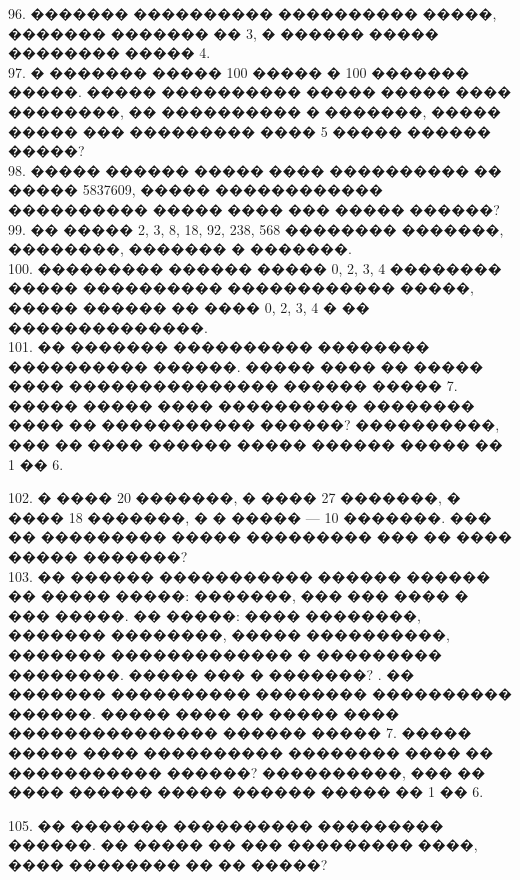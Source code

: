\documentclass[12pt]{article}
\begin{document}
96. ������� ���������� ���������� �����, ������� ������� �� 3, � ������ ����� �������� ����� 4.\\
97. � ������� ����� 100 ����� � 100 ������� �����. ����� ���������� ����� ����� ���� ��������, �� ���������� � �������, ����� ����� ��� ��������� ���� 5 ����� ������ �����?\\
98. ����� ������ ����� ���� ���������� �� ����� 5837609, ����� ������������ ���������� ����� ���� ��� ����� ������?\\
99. �� ����� 2, 3, 8, 18, 92, 238, 568 �������� �������, ��������, ������� � �������.\\
100. ��������� ������ ����� 0, 2, 3, 4 �������� ����� ���������� ������������ �����, ����� ������ �� ���� 0, 2, 3, 4 � �� ��������������.\\
101. �� ������� ���������� �������� ���������� ������. ����� ���� �� ����� ���� ��������������� ������ ����� 7. ����� ����� ���� ���������� �������� ���� �� ����������� ������? ����������, ��� �� ���� ������ ����� ������ ����� �� 1 �� 6.
\begin{center}
\begin{figure}[ht!]
\end{figure}
\end{center}
102. � ���� 20 �������, � ���� 27 �������, � ���� 18 �������, � � ����� --- 10 �������. ��� �� ��������� ����� ��������� ��� �� ���� ����� �������?\\
103. �� ������ ����������� ������ ������ �� ����� �����: �������, ��� ��� ���� � ��� �����. �� �����: ���� ��������, ������� ��������, ����� ����������, ������� ������������� � ��������� ��������. ����� ��� � �������?\newpage
{}. �� ������� ���������� �������� ���������� ������. ����� ���� �� ����� ���� ��������������� ������ ����� 7. ����� ����� ���� ���������� �������� ���� �� ����������� ������? ����������, ��� �� ���� ������ ����� ������ ����� �� 1 �� 6.
\begin{center}
\begin{figure}[ht!]
\end{figure}
\end{center}
105. �� ������� ���������� ��������� ������. �� ����� �� ��� ��������� ����, ���� �������� �� �� �����?
\begin{center}
\begin{figure}[ht!]
\end{figure}
\end{center}
\end{document}
